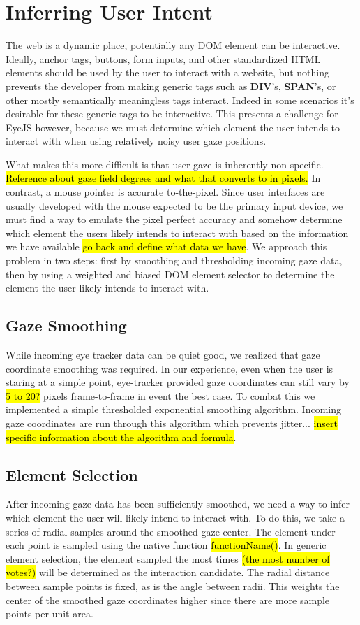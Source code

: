 \documentclass{sigchi}
\begin{document}
\section{Inferring User Intent}
The web is a dynamic place, potentially any DOM element can be 
interactive. Ideally, anchor tags, buttons, form inputs, and other 
standardized HTML elements should be used by the user to interact with a 
website, but nothing prevents the developer from making generic tags
such as \textbf{DIV}'s, \textbf{SPAN}'s, or other mostly semantically 
meaningless tags interact. Indeed in some scenarios it's desirable for 
these generic tags to be interactive. This presents a challenge 
for EyeJS however, because we must determine which element the user 
intends to interact with when using relatively noisy user gaze positions.

What makes this more difficult is that user gaze is inherently 
non-specific. \hl{Reference about gaze field degrees and what 
that converts to in pixels.} In contrast, a mouse pointer is accurate
to-the-pixel. Since user interfaces are usually developed with the 
mouse expected to be the primary input device, we must find a way to
emulate the pixel perfect accuracy and somehow determine which element 
the users likely intends to interact with based on the information we
have available \hl{go back and define what data we have}. We approach
this problem in two steps: first by smoothing and thresholding incoming
gaze data, then by using a weighted and biased DOM element selector to
determine the element the user likely intends to interact with.


\subsection{Gaze Smoothing}
While incoming eye tracker data can be quiet good, we realized that 
gaze coordinate smoothing was required. In our experience, even when
the user is staring at a simple point, eye-tracker provided gaze 
coordinates can still vary by \hl{5 to 20?} pixels frame-to-frame in
event the best case. To combat this we implemented a simple 
thresholded exponential smoothing algorithm. Incoming gaze coordinates
are run through this algorithm which prevents jitter... \hl{insert 
specific information about the algorithm and formula}.


\subsection{Element Selection}
After incoming gaze data has been sufficiently smoothed, we need a way
to infer which element the user will likely intend to interact with. To
do this, we take a series of radial samples around the smoothed gaze
center. The element under each point is sampled using the native
function \hl{functionName()}. In generic element selection, the 
element sampled the most times \hl{(the most number of votes?)} will
be determined as the interaction candidate. The radial distance 
between sample points is fixed, as is the angle between radii. 
This weights the center of the smoothed gaze coordinates higher 
since there are more sample points per unit area.
\end{document}
